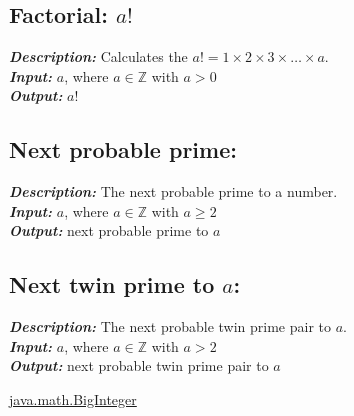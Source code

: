 \documentclass[12pt,oneside,a4paper]{article}
\begin{document}
\subsection*{Factorial: $a!$}
\textbf{\emph{Description:}} Calculates the $a! = 1 \times 2 \times 3 \times \dots \times a$. \\
\textbf{\emph{Input:}} $a$, where $a \in \mathbb{Z}$ with $a > 0$ \\
\textbf{\emph{Output:}} $a!$

\subsection*{Next probable prime:}
\textbf{\emph{Description:}} The next probable prime to a number. \\
\textbf{\emph{Input:}} $a$, where $a \in \mathbb{Z}$ with $a \ge 2$ \\
\textbf{\emph{Output:}} next probable prime to $a$

\subsection*{Next twin prime to $a$:}
\textbf{\emph{Description:}} The next probable twin prime pair to $a$. \\
\textbf{\emph{Input:}} $a$, where $a \in \mathbb{Z}$ with $a > 2$ \\
\textbf{\emph{Output:}} next probable twin prime pair to $a$


\begin{thebibliography}{}
	\newblock \href{https://docs.oracle.com/javase/7/docs/api/java/math/BigInteger.html}{java.math.BigInteger}
\end{thebibliography}
%

\end{document}
